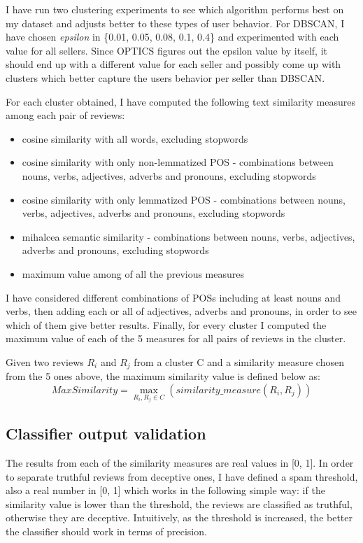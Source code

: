 I have run two clustering experiments to see which algorithm performs best on my dataset and adjusts better to these types of user behavior. For DBSCAN, I have chosen \textit{epsilon} in \{0.01, 0.05, 0.08, 0.1, 0.4\} and experimented with each value for all sellers. Since OPTICS figures out the epsilon value by itself, it should end up with a different value for each seller and possibly come up with clusters which better capture the users behavior per seller than DBSCAN. 

For each cluster obtained, I have computed the following text similarity measures among each pair of reviews:
\begin{itemize}
\item cosine similarity with all words, excluding stopwords
\item cosine similarity with only non-lemmatized POS - combinations between nouns, verbs, adjectives, adverbs and pronouns, excluding stopwords
\item cosine similarity with only lemmatized POS - combinations between nouns, verbs, adjectives, adverbs and pronouns, excluding stopwords
\item mihalcea semantic similarity - combinations between nouns, verbs, adjectives, adverbs and pronouns, excluding stopwords
\item maximum value among of all the previous measures
\end{itemize}

I have considered different combinations of POSs including at least nouns and verbs, then adding each or all of adjectives, adverbs and pronouns, in order to see which of them give better results.
Finally, for every cluster I computed the maximum value of each of the 5 measures for all pairs of reviews in the cluster. 

Given two reviews $R_i$ and $R_j$ from a cluster C and a similarity measure chosen from the 5 ones above, the maximum similarity value is defined below as:
\begin{equation}
MaxSimilarity = \max\limits_{R_i, R_j\in{C}}(similarity\_measure(R_i, R_j))
\end{equation}

\subsection{Classifier output validation}\label{subsection:validating_classifier_output}

The results from each of the similarity measures are real values in [0, 1]. In order to separate truthful reviews from deceptive ones, I have defined a spam threshold, also a real number in [0, 1] which works in the following simple way: if the similarity value is lower than the threshold, the reviews are classified as truthful, otherwise they are deceptive. Intuitively, as the threshold is increased, the better the classifier should work in terms of precision. 

